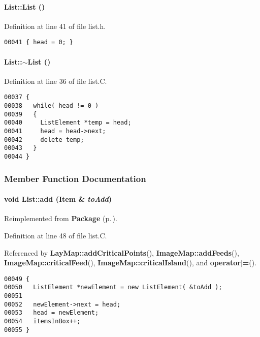 \paragraph{\setlength{\rightskip}{0pt plus 5cm}List::List ()\hspace{0.3cm}{\tt  [inline]}}\hfill



Definition at line 41 of file list.h.\small\begin{verbatim}00041 { head = 0; }
\end{verbatim}\normalsize 
\label{List_a1}
\paragraph{\setlength{\rightskip}{0pt plus 5cm}List::$\sim$List ()\hspace{0.3cm}{\tt  [virtual]}}\hfill



Definition at line 36 of file list.C.\small\begin{verbatim}00037 {
00038   while( head != 0 )
00039   {
00040     ListElement *temp = head;
00041     head = head->next;
00042     delete temp;
00043   }
00044 }
\end{verbatim}\normalsize 


\subsubsection{Member Function Documentation}
\label{List_a3}
\paragraph{\setlength{\rightskip}{0pt plus 5cm}void List::add ({\bf Item} \& {\em to\-Add})\hspace{0.3cm}{\tt  [virtual]}}\hfill



Reimplemented from {\bf Package} {\rm (p.\,\pageref{Package_a2})}.

Definition at line 48 of file list.C.

Referenced by {\bf Lay\-Map::add\-Critical\-Points}(), {\bf Image\-Map::add\-Feeds}(), {\bf Image\-Map::critical\-Feed}(), {\bf Image\-Map::critical\-Island}(), and {\bf operator$|$=}().\small\begin{verbatim}00049 {
00050   ListElement *newElement = new ListElement( &toAdd );
00051   
00052   newElement->next = head;
00053   head = newElement;
00054   itemsInBox++;
00055 }
\end{verbatim}\normalsize 
\label{List_a8}
